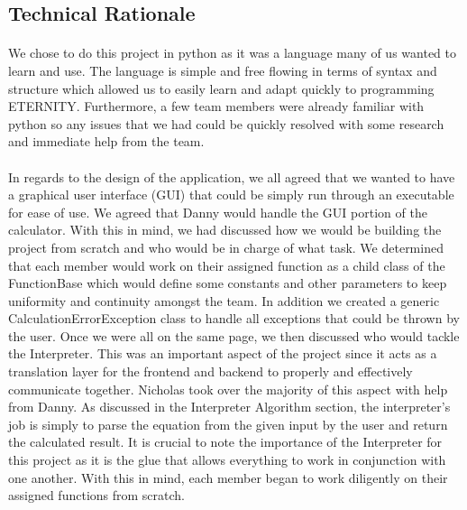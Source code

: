     \subsection{Technical Rationale}
        \paragraph{}
        We chose to do this project in python as it was a language many of us wanted to learn and use. The language is simple and free flowing in terms of syntax and structure which allowed us to easily learn and adapt quickly to programming ETERNITY. Furthermore, a few team members were already familiar with python so any issues that we had could be quickly resolved with some research and immediate help from the team.

        \paragraph{}
        In regards to the design of the application, we all agreed that we wanted to have a graphical user interface (GUI) that could be simply run through an executable for ease of use. We agreed that Danny would handle the GUI portion of the calculator. With this in mind, we had discussed how we would be building the project from scratch and who would be in charge of what task. We determined that each member would work on their assigned function as a child class of the FunctionBase which would define some constants and other parameters to keep uniformity and continuity amongst the team. In addition we created a generic CalculationErrorException class to handle all exceptions that could be thrown by the user. Once we were all on the same page, we then discussed who would tackle the Interpreter. This was an important aspect of the project since it acts as a translation layer for the frontend and backend to properly and effectively communicate together. Nicholas took over the majority of this aspect with help from Danny. As discussed in the Interpreter Algorithm section, the interpreter's job is simply to parse the equation from the given input by the user and return the calculated result. It is crucial to note the importance of the Interpreter for this project as it is the glue that allows everything to work in conjunction with one another. With this in mind, each member began to work diligently on their assigned functions from scratch.

